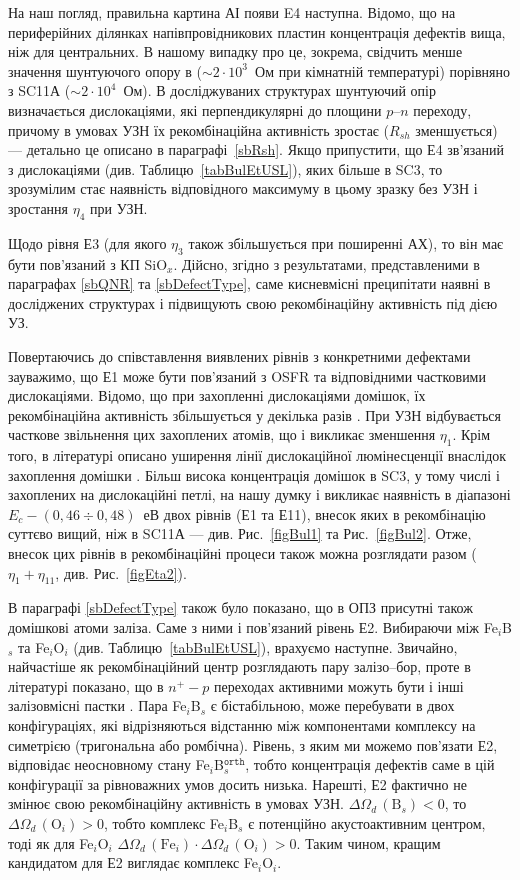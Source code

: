 На наш погляд, правильна картина АІ появи E4 наступна.
Відомо, що на периферійних ділянках напівпровідникових пластин концентрація дефектів вища,
ніж для центральних.
В нашому випадку про це, зокрема, свідчить менше значення шунтуючого опору в ($\sim2\cdot10^{3}$~Ом при кімнатній температурі) порівняно з SC11А ($\sim2\cdot10^{4}$~Ом).
В досліджуваних структурах шунтуючий опір визначається дислокаціями, які перпендикулярні до площини $p$--$n$ переходу, причому в умовах УЗН їх рекомбінаційна активність зростає ($R_{sh}$ зменшується) --- детально це описано в параграфі~\ref{sbRsh}.
Якщо припустити, що Е4 зв'язаний з дислокаціями (див. Таблицю~\ref{tabBulEtUSL}), яких більше в SC3, то зрозумілим стає наявність відповідного максимуму в цьому зразку без УЗН і зростання $\eta_4$ при УЗН.

Щодо рівня Е3 (для якого $\eta_3$ також збільшується при поширенні АХ),
то він має бути пов'язаний з КП SiO$_x$.
Дійсно, згідно з результатами, представленими в параграфах \ref{sbQNR} та \ref{sbDefectType},
саме кисневмісні преципітати наявні в досліджених структурах і підвищують свою рекомбінаційну активність під дією УЗ.

Повертаючись до співставлення виявлених рівнів з конкретними дефектами зауважимо,
що Е1 може бути пов'язаний з OSFR та відповідними частковими дислокаціями.
Відомо, що при захопленні дислокаціями домішок, їх рекомбінаційна активність
збільшується у декілька разів \cite{disl10:Kveder,Kittler2003}.
При УЗН відбувається часткове звільнення цих захоплених атомів, що і викликає
зменшення  $\eta_1$.
Крім того, в літературі описано уширення  лінії дислокаційної люмінесценції внаслідок захоплення домішки  \cite{PhysRevB56:10208}.
Більш висока концентрація домішок в SC3, у тому числі і захоплених на дислокаційні петлі,
на нашу думку і викликає наявність в діапазоні $E_c-(0,46\div0,48)$~еВ двох рівнів (Е1 та Е11),
внесок яких в рекомбінацію суттєво вищий, ніж в SC11А --- див. Рис.~\ref{figBul1} та Рис.~\ref{figBul2}.
Отже, внесок цих рівнів в рекомбінаційні процеси також можна розглядати разом ($\eta_1+\eta_{11}$, див. Рис.~\ref{figEta2}).

В параграфі \ref{sbDefectType} також було показано, що в ОПЗ присутні також домішкові атоми заліза.
Саме з ними і пов'язаний рівень Е2.
Вибираючи між Fe$_i$B$_s$ та Fe$_i$O$_i$ (див. Таблицю~\ref{tabBulEtUSL}), врахуємо наступне.
Звичайно, найчастіше як рекомбінаційний центр розглядають пару залізо--бор,
проте в літературі показано, що в $n^+-p$ переходах активними можуть бути і інші
залізовмісні пастки \cite{TeimurazPSS,TeimurazJAP}.
Пара  Fe$_i$B$_s$ є бістабільною, може перебувати в двох конфігураціях, які відрізняються відстанню між компонентами комплексу на симетрією (тригональна або ромбічна).
Рівень, з яким ми можемо пов'язати Е2, відповідає неосновному стану Fe$_i$B$_s^\mathtt{orth}$, тобто концентрація дефектів саме в цій конфігурації за рівноважних умов досить низька.
Нарешті, Е2 фактично не змінює свою рекомбінаційну активність в умовах УЗН.
$\Delta\Omega_d\,(\mbox{B}_s)<0$, то $\Delta\Omega_d\,(\mbox{O}_i)>0$, тобто комплекс
Fe$_i$B$_s$ є потенційно акустоактивним центром, тоді як для Fe$_i$O$_i$
$\Delta\Omega_d\,(\mbox{Fe}_i)\cdot\Delta\Omega_d\,(\mbox{O}_i)>0$.
Таким чином, кращим кандидатом для Е2 виглядає комплекс Fe$_i$O$_i$.

